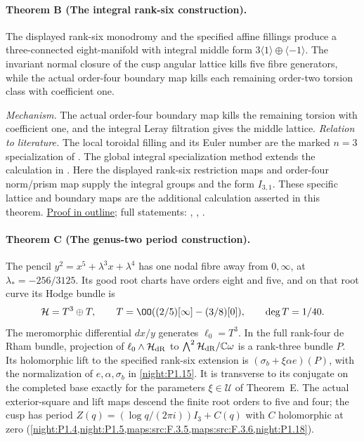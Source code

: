 \hypertarget{main-V-B}{}
\paragraph{Theorem B (The integral rank-six construction).}
\label{series:V:B}
The displayed rank-six monodromy and the specified affine
fillings produce a three-connected eight-manifold with integral middle
form $3\langle1\rangle\oplus\langle-1\rangle$.  The invariant normal closure of the cusp angular lattice
kills five fibre generators, while the actual order-four boundary
map kills each remaining order-two torsion class with coefficient one.

\textit{Mechanism.} The actual order-four boundary map kills the remaining torsion with coefficient one, and the integral Leray filtration gives the middle lattice.
\textit{Relation to literature.}
The local toroidal filling and its Euler number are the marked
$n=3$ specialization of \cite[Theorem~8.7 and Corollary~8.8,
attached-source edition, pp.~57--59]{Yang2026}.  The global integral specialization
method extends the calculation in \cite[\S7.7]{AC26}.
Here the displayed rank-six restriction maps and order-four
norm/prism map supply the integral groups and the form $I_{3,1}$.
These specific lattice and boundary maps are the additional
calculation asserted in this theorem.
\hyperlink{outline-V-B}{Proof in outline}; full statements: , , .

\hypertarget{main-V-C}{}
\paragraph{Theorem C (The genus-two period construction).}
\label{series:V:C}
The pencil $y^2=x^5+\lambda^3x+\lambda^4$ has one nodal
fibre away from $0,\infty$, at $\lambda_*=-256/3125$.
Its good root charts have orders eight and five, and on that root
curve its Hodge bundle is
\[
 \mathcal H=T^3\oplus T,\qquad
 T=\OO((2/5)[\infty]-(3/8)[0]),\qquad \deg T=1/40.
\]
The meromorphic differential $dx/y$ generates $\ell_0=T^3$.
In the full rank-four de Rham bundle, projection of
$\ell_0\wedge\mathcal H_{\rm dR}$ to
$\bigwedge^2\mathcal H_{\rm dR}/\mathbb C\omega$
is a rank-three bundle $P$.  Its holomorphic lift to the specified
rank-six extension is $(\sigma_b+\xi\alpha e)(P)$, with the
normalization of $e,\alpha,\sigma_b$ in \cref{night:P1.15}.
It is transverse to its conjugate on the completed base exactly
for the parameters $\xi\in\mathcal U$ of Theorem~E.
The actual exterior-square and lift maps descend the finite root
orders to five and four; the cusp has period
$Z(q)=(\log q/(2\pi i))I_3+C(q)$ with $C$ holomorphic at zero
(\cref{night:P1.4,night:P1.5,maps:src:F.3.5,maps:src:F.3.6,night:P1.18}).

